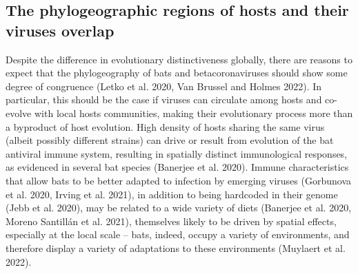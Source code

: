 \documentclass[11pt]{article}
\begin{document}
\hypertarget{the-phylogeographic-regions-of-hosts-and-their-viruses-overlap}{%
\subsection{The phylogeographic regions of hosts and their viruses
overlap}\label{the-phylogeographic-regions-of-hosts-and-their-viruses-overlap}}

Despite the difference in evolutionary distinctiveness globally, there
are reasons to expect that the phylogeography of bats and
betacoronaviruses should show some degree of congruence (Letko et al.
2020, Van Brussel and Holmes 2022). In particular, this should be the
case if viruses can circulate among hosts and co-evolve with local hosts
communities, making their evolutionary process more than a byproduct of
host evolution. High density of hosts sharing the same virus (albeit
possibly different strains) can drive or result from evolution of the
bat antiviral immune system, resulting in spatially distinct
immunological responses, as evidenced in several bat species (Banerjee
et al. 2020). Immune characteristics that allow bats to be better
adapted to infection by emerging viruses (Gorbunova et al. 2020, Irving
et al. 2021), in addition to being hardcoded in their genome (Jebb et
al. 2020), may be related to a wide variety of diets (Banerjee et al.
2020, Moreno Santillán et al. 2021), themselves likely to be driven by
spatial effects, especially at the local scale -- bats, indeed, occupy a
variety of environments, and therefore display a variety of adaptations
to these environments (Muylaert et al. 2022).
\end{document}
